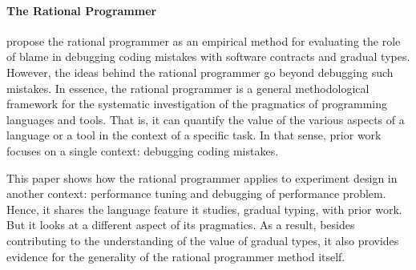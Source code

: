 \paragraph{The Rational Programmer}

 \citet{lksfd-popl-2020,lgfd-icfp-2021} propose the rational programmer as
 an empirical method for evaluating the role of blame in debugging coding
 mistakes with software contracts and gradual types. However, the ideas
 behind the rational programmer go beyond debugging such mistakes. In
 essence, the rational programmer is a general methodological framework
 for the systematic investigation of the pragmatics of programming
 languages and tools. That is, it can quantify the value of the various
 aspects of a language or a tool in the context of a specific task. In
 that sense, prior work focuses on a single context: debugging
 coding mistakes.

 This paper shows how the rational programmer applies
 to experiment design in another context: performance tuning and debugging of performance
 problem. Hence, it shares the language feature it studies, gradual
 typing, with prior work. But it looks at a different aspect
 of its pragmatics. As a result, besides contributing to the understanding
 of the value of gradual types, it also provides evidence for the
 generality of the rational programmer method itself.


